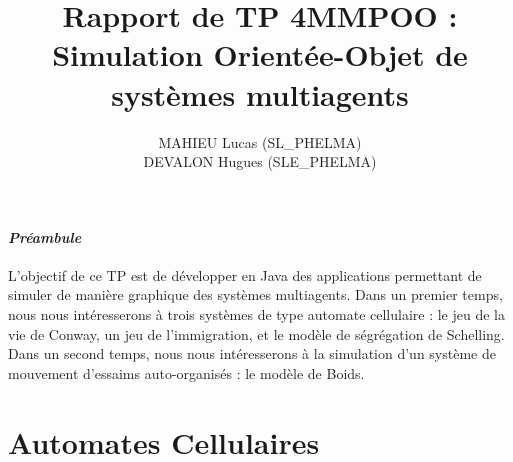 \documentclass[a4paper, 10pt, french]{article}
\title{Rapport de TP 4MMPOO : Simulation Orientée-Objet de systèmes multiagents }
\author{
MAHIEU Lucas (SL\_PHELMA) 
\\ DEVALON Hugues (SLE\_PHELMA) 
}
\begin{document}
\maketitle

\paragraph{\em Préambule}
{L’objectif de ce TP est de développer en Java des applications permettant de simuler de manière graphique des systèmes multiagents. Dans un premier temps, nous nous intéresserons à trois systèmes de type automate cellulaire : le jeu de la vie de Conway, un jeu de l’immigration, et le modèle de ségrégation de Schelling. Dans un second temps, nous nous intéresserons à la simulation d’un système de mouvement d’essaims auto-organisés : le modèle de Boids.
}

\section{Automates Cellulaires}
\end{document}
